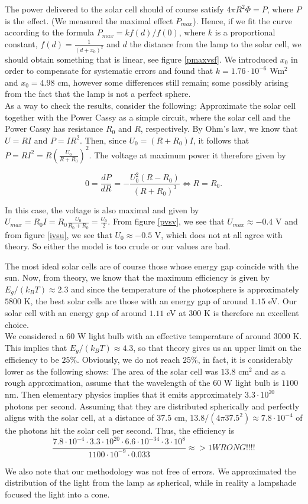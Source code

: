 \documentclass[a4paper]{article}
\begin{document}
The power delivered to the solar cell should of course satisfy $4\pi R^2\Phi = P$, where $P$ is the effect. (We measured the maximal effect $P_{max}$). Hence, if we fit the curve according to the formula $P_{max}=kf(d)/f(0)$, where $k$ is a proportional constant, $f(d)=\frac{1}{(d+x_0)^2}$ and $d$ the distance from the lamp to the solar cell, we should obtain something that is linear, see figure \ref{pmaxvsf}. We introduced $x_0$ in order to compensate for systematic errors and found that $k=1.76\cdot 10^{-6}$ Wm${}^2$ and $x_0=4.98$ cm, however some differences still remain; some possibly arising from the fact that the lamp is not a perfect sphere. \\

As a way to check the results, consider the following: Approximate the solar cell together with the Power Cassy as a simple circuit, where the solar cell and the Power Cassy has resistance $R_0$ and $R$, respectively. 
By Ohm's law, we know that $U=RI$ and $P=IR^2$. Then, since $U_0=(R+R_0)I$, it follows that $P=RI^2=R\left( \frac{U_0}{R+R_0} \right)^2$.
The voltage at maximum power it therefore given by

\begin{displaymath}
  0=\frac{dP}{dR}=-\frac{U_0^2(R-R_0)}{(R+R_0)^3}\iff R=R_0.
\end{displaymath}

In this case, the voltage is also maximal and given by $U_{max}=R_0I=R_0\frac{U_0}{R_0+R_0}=\frac{U_0}{2}$.
From figure \ref{pvsv}, we see that $U_{max}\approx -0.4$ V and from figure \ref{ivsu}, we see that $U_0\approx -0.5$ V, which does not at all agree with theory. So either the model is too crude or our values are bad.

The most ideal solar cells are of course those whose energy gap coincide with the sun. Now, from theory, we know that the maximum efficiency is given by $E_g/(k_BT)\approx 2.3$ and since the temperature of the photosphere is approximately $5800$ K, the best solar cells are those with an energy gap of around $1.15$ eV.
Our solar cell with an energy gap of around $1.11$ eV at $300$ K is therefore an excellent choice. \\

We considered a $60$ W light bulb with an effective temperature of around $3000$ K. This implies that $E_g/(k_B T)\approx 4.3$, so that theory gives us an upper limit on the efficiency to be $25$\%.
Obviously, we do not reach $25$\%, in fact, it is considerably lower as the following shows:
The area of the solar cell was $13.8$ cm${}^2$ and as a rough approximation, assume that the wavelength of the $60$ W light bulb is $1100$ nm. Then elementary physics implies that it emits approximately $3.3\cdot 10^{20}$ photons per second. Assuming that they are distributed spherically and perfectly aligns with the solar cell, at a distance of $37.5$ cm, $13.8/(4\pi 37.5^2)\approx 7.8\cdot 10^{-4}$ of the photons hit the solar cell per second.
Thus, the efficiency is 
\begin{displaymath}
  \frac{7.8\cdot 10^{-4}\cdot 3.3\cdot 10^{20}\cdot 6.6\cdot 10^{-34}\cdot 3\cdot 10^8}{1100\cdot 10^{-9}\cdot 0.033 }\approx >1 WRONG!!!!
\end{displaymath}

We also note that our methodology was not free of errors. We approximated the distribution of the light from the lamp as spherical, while in reality a lampshade focused the light into a cone.
\end{document}
